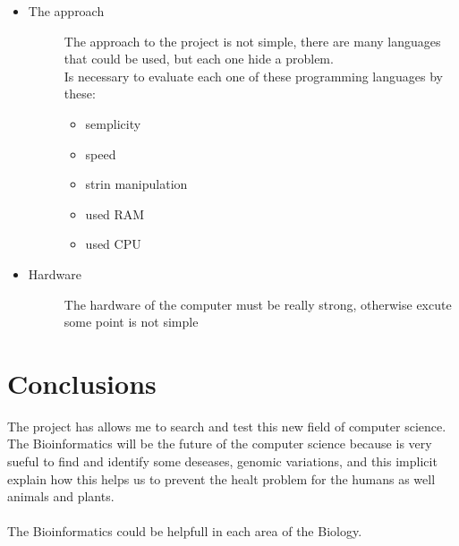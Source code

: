\begin{itemize}
\item \begin{description}
		\item[The approach] The approach to the project is not simple, there are many languages that could be used, but each one hide a problem.\\
		Is necessary to evaluate each one of these programming languages by these:
		\begin{itemize}
			\item semplicity
			\item speed
			\item strin manipulation
			\item used RAM
			\item used CPU
		\end{itemize}
  \end{description}
\end{itemize}


\begin{itemize}
\item \begin{description}
		\item[Hardware] The hardware of the computer must be really strong, otherwise excute some point is not simple
  \end{description}
\end{itemize}

\section{Conclusions}
The project has allows me to search and test this new field of computer science.
The Bioinformatics will be the future of the computer science because is very sueful to find and identify some deseases, genomic variations, and this implicit explain how this helps us to prevent the healt problem for the humans as well animals and plants.\\\\
The Bioinformatics could be helpfull in each area of the Biology.